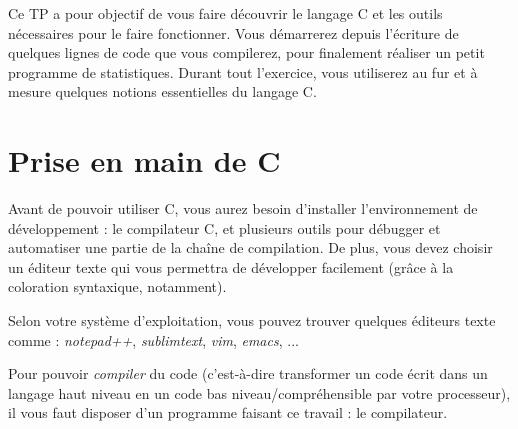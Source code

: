 \documentclass[11pt,a4paper]{article}
\begin{document}
\EncadreTitre

\bigskip


%
%

\bigskip


Ce TP a pour objectif de vous faire découvrir le langage C et les outils nécessaires pour le faire fonctionner.
Vous démarrerez depuis l'écriture de quelques lignes de code que vous compilerez, pour finalement réaliser un petit programme de statistiques.
Durant tout l'exercice, vous utiliserez au fur et à mesure quelques notions essentielles du langage C.

\bigskip

\section{Prise en main de C}

\bigskip

Avant de pouvoir utiliser C, vous aurez besoin d'installer l'environnement de développement : le compilateur C, et plusieurs outils pour débugger et automatiser une partie de la chaîne de compilation.
De plus, vous devez choisir un éditeur texte qui vous permettra de développer facilement (grâce à la coloration syntaxique, notamment).

Selon votre système d'exploitation, vous pouvez trouver quelques éditeurs texte comme : \textit{notepad++}, \textit{sublimtext}, \textit{vim}, \textit{emacs}, ...

\bigskip

Pour pouvoir \textit{compiler} du code (c'est-à-dire transformer un code écrit dans un langage haut niveau en un code bas niveau/compréhensible par votre processeur), il vous faut disposer d'un programme faisant ce travail : le compilateur.
\end{document}
